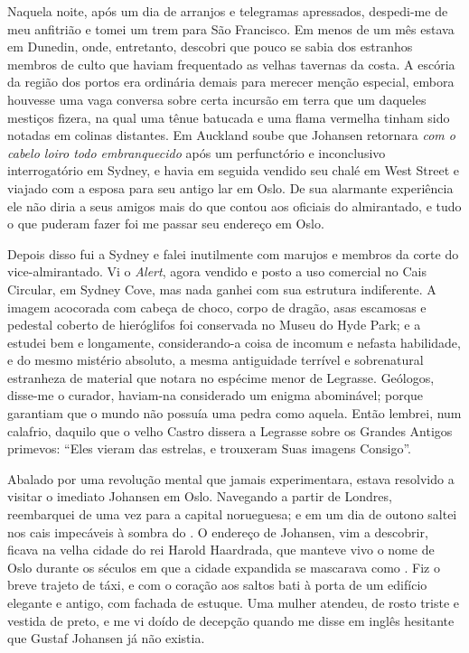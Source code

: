 \begin{pages}
\begin{Rightside}
Naquela noite, após um dia de arranjos e telegramas apressados,
despedi-me de meu anfitrião e tomei um trem para São Francisco. Em menos
de um mês estava em Dunedin, onde, entretanto, descobri que pouco se
sabia dos estranhos membros de culto que haviam frequentado as velhas
tavernas da costa. A escória da região dos portos era ordinária demais
para merecer menção especial, embora houvesse uma vaga conversa sobre
certa incursão em terra que um daqueles mestiços fizera, na qual uma
tênue batucada e uma flama vermelha tinham sido notadas em colinas
distantes. Em Auckland soube que Johansen retornara \emph{com o cabelo
loiro todo embranquecido} após um perfunctório e inconclusivo
interrogatório em Sydney, e havia em seguida vendido seu chalé em West
Street e viajado com a esposa para seu antigo lar em Oslo. De sua
alarmante experiência ele não diria a seus amigos mais do que contou aos
oficiais do almirantado, e tudo o que puderam fazer foi me passar seu
endereço em Oslo.

Depois disso fui a Sydney e falei inutilmente com marujos e membros da
corte do vice-almirantado. Vi o \emph{Alert}, agora vendido e posto a
uso comercial no Cais Circular, em Sydney Cove, mas nada ganhei com sua
estrutura indiferente. A imagem acocorada com cabeça de choco, corpo de
dragão, asas escamosas e pedestal coberto de hieróglifos foi conservada
no Museu do Hyde Park; e a estudei bem e longamente, considerando-a
coisa de incomum e nefasta habilidade, e do mesmo mistério absoluto, a
mesma antiguidade terrível e sobrenatural estranheza de material que
notara no espécime menor de Legrasse. Geólogos, disse-me o curador,
haviam-na considerado um enigma abominável; porque garantiam que o mundo
não possuía uma pedra como aquela. Então lembrei, num calafrio, daquilo
que o velho Castro dissera a Legrasse sobre os Grandes Antigos primevos:
``Eles vieram das estrelas, e trouxeram Suas imagens Consigo''.

Abalado por uma revolução mental que jamais experimentara, estava
resolvido a visitar o imediato Johansen em Oslo. Navegando a partir de
Londres, reembarquei de uma vez para a capital norueguesa; e em um dia
de outono saltei nos cais impecáveis à sombra do . O endereço de Johansen, vim a descobrir, ficava na velha
cidade do rei Harold Haardrada, que manteve vivo o nome de Oslo durante
os séculos em que a cidade expandida se mascarava como
. Fiz o breve trajeto de táxi, e com o coração aos
saltos bati à porta de um edifício elegante e antigo, com fachada de
estuque. Uma mulher atendeu, de rosto triste e vestida de preto, e me vi
doído de decepção quando me disse em inglês hesitante que Gustaf
Johansen já não existia.


\end{Rightside}
\end{pages}
